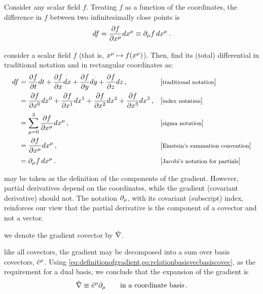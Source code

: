  Consider any scalar field $f$. Treating $f$ as a function of the coordinates, the difference in $f$ between two infinitesimally close points is
%
\begin{equation}\label{eq:definitionofgradient}
  df = \dfrac{\partial f}{\partial\tvec\pos\mu}d\tvec\pos\mu
     \defas\ipd\mu f\,d\tvec\pos\mu\,.
\end{equation}

 consider a scalar field $f$ (that is, $\fmap{\tvec\pos\mu}{f\vat{\tvec\pos\mu}}$). Then, find its (total) differential in traditional notation and in rectangular coordinates as:
%
\begin{align*}
  df &=   \dfrac{\partial f}{\partial t}    dt
        + \dfrac{\partial f}{\partial\xpos} d\xpos
        + \dfrac{\partial f}{\partial\ypos} d\ypos
        + \dfrac{\partial f}{\partial\zpos} d\zpos\,,        &&\eqtxt{traditional notation} \\
     &=   \dfrac{\partial f}{\partial\tvec\pos 0} d\tvec\pos 0
        + \dfrac{\partial f}{\partial\tvec\pos 1} d\tvec\pos 1
        + \dfrac{\partial f}{\partial\tvec\pos 2} d\tvec\pos 2
        + \dfrac{\partial f}{\partial\tvec\pos 3} d\tvec\pos 3 \,,                  &&\eqtxt{index notation} \\
     &= \sum_{\mu = 0}^{3}\dfrac{\partial f}{\partial\tvec\pos\mu} d\tvec\pos\mu\,, &&\eqtxt{sigma notation} \\
     &= \dfrac{\partial f}{\partial\tvec\pos\mu} d\tvec\pos\mu\,,  &&\eqtxt{Einstein's summation convention} \\
     &= \ipd\mu f\,d\tvec\pos\mu\,.       &&\eqtxt{Jacobi's notation for partials}
\end{align*}

 may be taken as the definition of the components of the gradient. However, partial derivatives depend on the coordinates, while the gradient (covariant derivative) should not. The notation $\partial_{\mu}$, with its covariant (subscript) index, reinforces our view that the partial derivative is the component of a covector and not a vector. 

 we denote the gradient covector by $\tilde{\nabla}$.

 like all covectors, the gradient may be decomposed into a sum over basis covectors, $\tbcov\mu$. Using \cref{eq:definitionofgradient,eq:relationbasisvecbasiscovec}, as the requirement for a dual basis, we conclude that the expansion of the gradient is
%
\begin{equation}\label{eq:gradientexpansiononcoordinatebasis}
  \gradcov \defas \tbcov\mu\ipd\mu\qquad\text{in a coordinate basis}\,.
\end{equation}

